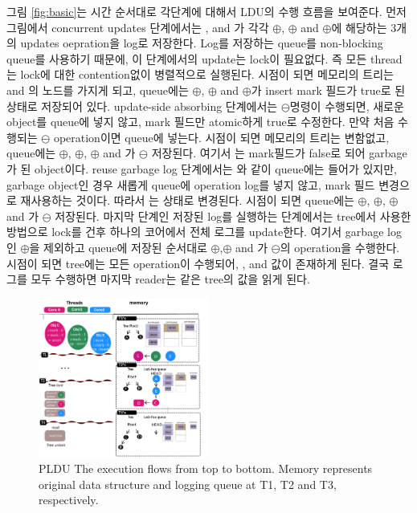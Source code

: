 그림 \ref{fig:basic}는 시간 순서대로 각단계에 대해서 LDU의 수행 흐름을 보여준다.
먼저 그림에서 concurrent updates 단계에서는 ,  and 가 각각
$\oplus$, $\oplus$ and
$\oplus$에 해당하는 3개의 updates oepration을 log로 저장한다. 
Log를 저장하는 queue를 non-blocking queue를 사용하기 때문에, 이 단계에서의 update는 lock이 필요없다. 
즉 모든 thread는 lock에 대한 contention없이 병렬적으로 실행된다. 
 시점이 되면 메모리의 트리는  and 의 노드를 가지게 되고, queue에는 
$\oplus$, $\oplus$ and $\oplus$가 insert mark 필드가
true로 된 상태로 저장되어 있다. 
update-side absorbing 단계에서는  $\ominus$명령이 수행되면, 새로운 object를 queue에 넣지
않고, mark 필드만 atomic하게 true로 수정한다.  
만약 처음 수행되는 $\ominus$ operation이면 queue에 넣는다.
 시점이 되면 메모리의 트리는 변함없고, queue에는 
$\oplus$, $\oplus$, $\oplus$ and 가
$\ominus$ 저장된다. 여기서 는 mark필드가 false로 되어 garbage가 된 object이다.
reuse garbage log 단계에서는 와 같이 queue에는 들어가 있지만, garbage object인 경우 새롭게
queue에 operation log를 넣지 않고, mark 필드 변경으로 재사용하는 것이다. 
따라서 는  상태로 변경된다. 
 시점이 되면 queue에는 
$\oplus$, $\oplus$, $\oplus$ and 가
$\ominus$ 저장된다.
마지막 단계인 저장된 log를 실행하는 단계에서는 tree에서 사용한 방법으로 lock를 건후 하나의 코어에서 
전체 로그를 update한다. 여기서 garbage log인  $\oplus$을 제외하고 queue에 저장된 순서대로 
$\oplus$,$\oplus$ and 가 $\ominus$의 operation을
수행한다.  시점이 되면 tree에는 
모든 operation이 수행되어, ,  and  값이 존재하게 된다.
결국 로그를 모두 수행하면 마지막 reader는 같은 tree의 값을 읽게 된다. 

\begin{figure}[tb]
  \begin{center}
     \includegraphics[width=0.5\textwidth,keepaspectratio]{fig/basic_pldu2}
  \end{center}
  \caption{PLDU The execution flows from top to bottom. Memory
  represents original data structure and logging queue at T1, T2 and T3, respectively.}
  \label{fig:basicpldu}
\end{figure}

